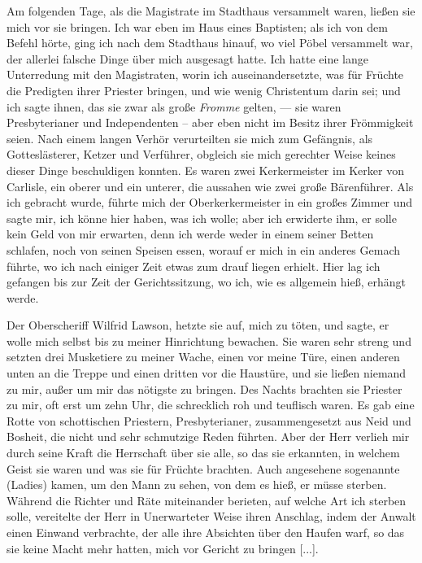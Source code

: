 Am folgenden Tage, als die
Magistrate im Stadthaus versammelt waren, ließen sie mich vor
sie bringen. Ich war eben im Haus eines Baptisten; als ich
von dem Befehl hörte, ging ich nach dem Stadthaus hinauf, wo
viel Pöbel versammelt war, der allerlei falsche Dinge über mich
ausgesagt hatte. Ich hatte eine lange Unterredung mit den
Magistraten, worin ich auseinandersetzte, was für Früchte die
Predigten ihrer Priester bringen, und wie wenig Christentum darin
sei; und ich sagte ihnen, das sie zwar als große \textit{Fromme}
gelten, — sie waren Presbyterianer 
und Independenten -- aber
eben nicht im Besitz ihrer Frömmigkeit seien. Nach einem langen
Verhör verurteilten sie mich zum Gefängnis, als Gotteslästerer,
Ketzer und Verführer, obgleich sie mich gerechter Weise keines
dieser Dinge beschuldigen konnten. Es waren zwei Kerkermeister
im Kerker von Carlisle, ein oberer und ein 
unterer, die aussahen wie zwei große Bärenführer. 
Als ich gebracht wurde,
führte mich der Oberkerkermeister in ein großes Zimmer und sagte
mir, ich könne hier haben, was ich wolle; aber ich erwiderte
ihm, er solle kein Geld von mir erwarten, denn ich werde weder
in einem seiner Betten schlafen, noch von seinen Speisen essen,
worauf er mich in ein anderes Gemach führte, wo ich nach einiger
Zeit etwas zum drauf liegen erhielt. Hier lag ich gefangen bis
zur Zeit der Gerichtssitzung, wo ich, wie es allgemein hieß, 
erhängt werde. 


Der Oberscheriff Wilfrid 
Lawson, hetzte sie auf,
mich zu töten, und sagte, er wolle mich selbst bis zu meiner 
Hinrichtung bewachen. Sie waren sehr streng und setzten drei 
Musketiere zu meiner Wache, einen vor meine Türe, einen anderen
unten an die Treppe und einen dritten vor die Haustüre, und
sie ließen niemand zu mir, außer um mir das nötigste zu bringen.
Des Nachts brachten sie Priester zu mir, oft erst um zehn Uhr,
die schrecklich roh und teuflisch waren. Es gab eine Rotte von
schottischen Priestern, Presbyterianer, 
zusammengesetzt aus Neid
und Bosheit, die nicht 
und sehr schmutzige Reden führten. Aber der Herr verlieh mir
durch seine Kraft die Herrschaft über sie alle, so das sie erkannten,
in welchem Geist sie waren und was sie für Früchte brachten.
Auch angesehene sogenannte  (Ladies) kamen, um den
Mann zu sehen, von dem es hieß, er müsse sterben. Während
die Richter und Räte miteinander berieten, auf welche Art ich
sterben solle, vereitelte der Herr in Unerwarteter Weise ihren
Anschlag, indem der Anwalt einen Einwand verbrachte, der
alle ihre Absichten über den Haufen warf, so das sie keine
Macht mehr hatten, mich vor Gericht zu bringen [...].

